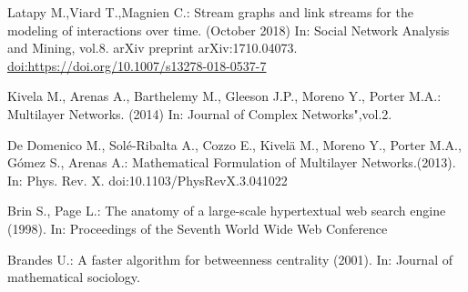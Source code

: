 \documentclass{svproc}
\begin{document}
%
\begin{thebibliography}{6}
%


Latapy M.,Viard T.,Magnien C.: Stream graphs and link streams for the modeling
of interactions over time. (October 2018) In: Social Network Analysis and Mining, vol.8. arXiv preprint arXiv:1710.04073. \url{doi:https://doi.org/10.1007/s13278-018-0537-7}

Kivela M., Arenas A., Barthelemy M., Gleeson J.P., Moreno Y., Porter M.A.: Multilayer Networks. (2014) In: Journal of Complex Networks",vol.2.

De Domenico M., Sol\'e-Ribalta A., Cozzo E., Kivel\"a M., Moreno Y., Porter M.A., G\'omez S., Arenas A.: Mathematical Formulation of Multilayer Networks.(2013). In: Phys. Rev. X. doi:10.1103/PhysRevX.3.041022

Brin S., Page L.: The anatomy of a large-scale hypertextual web search engine (1998). In: Proceedings of the Seventh World Wide Web Conference

Brandes U.: A faster algorithm for betweenness centrality (2001). In: Journal of mathematical sociology.



\end{thebibliography}
\end{document}
